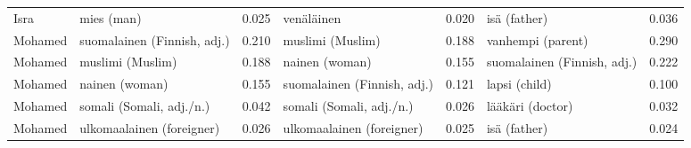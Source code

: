 \begin{longtable}{llrlrlr}
   Isra &                  mies (man) &                            0.025 &                  venäläinen &                                 0.020 &                isä (father) &                           0.036 \\
Mohamed & suomalainen (Finnish, adj.) &                            0.210 &            muslimi (Muslim) &                                 0.188 &           vanhempi (parent) &                           0.290 \\
Mohamed &            muslimi (Muslim) &                            0.188 &              nainen (woman) &                                 0.155 & suomalainen (Finnish, adj.) &                           0.222 \\
Mohamed &              nainen (woman) &                            0.155 & suomalainen (Finnish, adj.) &                                 0.121 &               lapsi (child) &                           0.100 \\
Mohamed &    somali (Somali, adj./n.) &                            0.042 &    somali (Somali, adj./n.) &                                 0.026 &            lääkäri (doctor) &                           0.032 \\
Mohamed &   ulkomaalainen (foreigner) &                            0.026 &   ulkomaalainen (foreigner) &                                 0.025 &                isä (father) &                           0.024 \\
\end{longtable}
